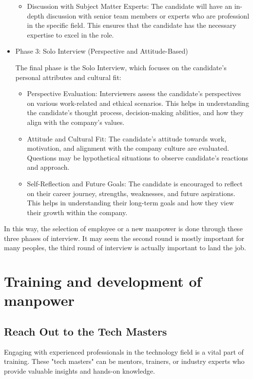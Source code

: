 \begin{itemize}
\begin{itemize}
    \item Discussion with Subject Matter Experts:
        The candidate will have an in-depth discussion with senior team members or experts who are professionl in the specific field. This ensures that the candidate has the necessary expertise to excel in the role.
    \end{itemize} 
\item Phase 3: Solo Interview (Perspective and Attitude-Based)

The final phase is the Solo Interview, which focuses on the candidate's personal attributes and cultural fit:
    \begin{itemize}
    \item Perspective Evaluation:
        Interviewers assess the candidate’s perspectives on various work-related and ethical scenarios. This helps in understanding the candidate's thought process, decision-making abilities, and how they align with the company's values.

    \item Attitude and Cultural Fit:
        The candidate's attitude towards work, motivation, and alignment with the company culture are evaluated. Questions may be hypothetical situations to observe candidate's reactions and approach.

    \item Self-Reflection and Future Goals:
        The candidate is encouraged to reflect on their career journey, strengths, weaknesses, and future aspirations. This helps in understanding their long-term goals and how they view their growth within the company.
    \end{itemize}     
\end{itemize}

In this way, the selection of employee or a new manpower is done through these three phases of interview. It may seem the second round is mostly important for many peoples, the third round of interview is actually important to land the job.
\section{Training and development of manpower}
\subsection{Reach Out to the Tech Masters}


Engaging with experienced professionals in the technology field is a vital part of training. These "tech masters" can be mentors, trainers, or industry experts who provide valuable insights and hands-on knowledge.

